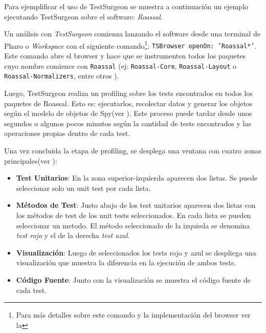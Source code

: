 \par Para ejemplificar el uso de TestSurgeon se muestra a continuación un ejemplo ejecutando TestSurgeon sobre el software: \emph{Roassal}.

\par Un análisis con \emph{TestSurgeon} comienza lanzando el software desde una terminal de Pharo o \emph{Workspace} con el siguiente comando\footnote{Para más detalles sobre este comando y la implementación del browser ver la  }: {\tt TSBrowser openOn: 'Roassal*'}. Este comando abre el browser y hace que se instrumenten todos los paquetes cuyo nombre comience con {\tt Roassal} (ej: {\tt Roassal-Core}, {\tt Roassal-Layout} o {\tt Roassal-Normalizers}, entre otros ).


\par Luego, TestSurgeon realiza un profiling sobre los tests encontrados en todos los paquetes de Roassal. Esto es: ejecutarlos, recolectar datos y generar los objetos según el modelo de objetos de Spy(ver ). Este proceso puede tardar desde unos segundos o algunos pocos minutos según la cantidad de tests encontrados y las operaciones propias dentro de cada test.

\par Una vez concluida la etapa de profiling, se desplega una ventana con cuatro zonas principales(ver ): 
\begin{itemize}
\item {\bf Test Unitarios}: En la zona superior-izquierda aparecen dos listas. Se puede seleccionar solo un unit test por cada lista.
\item {\bf Métodos de Test}: Justo abajo de los test unitarios aparecen dos listas con los métodos de test de los unit tests seleccionados. En cada lista se pueden seleccionar un metodo. El método seleccionado de la izquieda se denomina \emph{test rojo} y el de la derecha \emph{test azul}.
\item {\bf Visualización}: Luego de seleccionados los tests rojo y azul se despliega una visualización que muestra la diferencia en la ejecución de ambos tests.
\item {\bf Código Fuente}: Junto con la visualización se muestra el código fuente de cada test.
\end{itemize}


